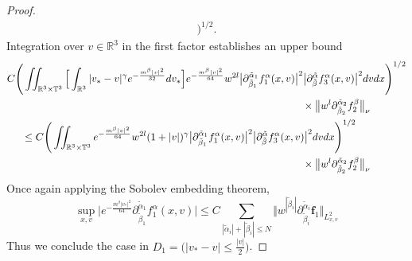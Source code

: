 \documentclass[reqno]{amsart}
\numberwithin{equation}{section}
\numberwithin{equation}{section}
\begin{document}
\begin{proof}
\begin{align*}
			\Bigg)^{1/2}.
		\end{align*}
		‌Integration over $v \in \mathbb{R}^3$
		 in the first factor establishes an upper bound
		 \begin{align*}
		 &C \Bigg( \iint_{\mathbb{R}^3\times\mathbb{T}^3} \Big[ \int_{\mathbb{R}^3} |v_* - v|^\gamma e^{-\frac{m^{\beta}|v|^2}{32}} dv_* \Big] e^{-\frac{m^{\beta}|v|^2}{64}} w^{2l} \big| \partial_{\tilde{\beta}_1}^{\tilde{\alpha}_1}f^{\alpha}_1 (x,v) \big|^2 
		 \big| \partial_{\tilde{\beta}}^{\tilde{\alpha}}f^{\alpha}_3 (x,v) \big|^2 dv dx \Bigg)^{1/2}\\
		 &\hspace{10cm}\times\big\| w^l \partial_{\tilde{\beta}_2}^{\tilde{\alpha}_2}f^{\beta}_2 \big\|_{\nu}\\
		 &\hspace{0.5cm}\leq C \Bigg( \iint_{\mathbb{R}^3\times\mathbb{T}^3} e^{-\frac{m^{\beta}|v|^2}{64}} w^{2l} (1 + |v|)^\gamma \big| \partial_{\tilde{\beta}_1}^{\tilde{\alpha}_1}f^{\alpha}_1 (x,v) \big|^2 
		 \big| \partial_{\tilde{\beta}}^{\tilde{\alpha}}f^{\alpha}_3 (x,v) \big|^2 dv dx \Bigg)^{1/2}\\
		 &\hspace{10cm}\times\big\| w^l \partial_{\tilde{\beta}_2}^{\tilde{\alpha}_2}f^{\beta}_2 \big\|_{\nu}
		 \end{align*}
		 Once again applying the Sobolev embedding theorem,  
		 \begin{equation*}
		 	\sup_{x,v} \Big| e^{-\frac{m^{\beta}|v_*|^2}{64}} \partial_{\tilde{\beta}_1}^{\tilde{\alpha}_1}f^{\alpha}_1 (x,v) \Big| \leq C \sum_{|\tilde{\alpha}_i|+|\tilde{\beta}_i|\leq N}\big\Vert w^{|\tilde{\beta}_i|}\partial_{\tilde{\beta}_i}^{\tilde{\alpha}_i}\mathbf{f}_1\big\Vert_{L^{2}_{x,v}}
		 \end{equation*}
		 Thus we conclude the  case in $D_1=\big(|v_*-v|\leq \frac{|v|}{2}\big)$.
		 

\end{proof}
\end{document}
